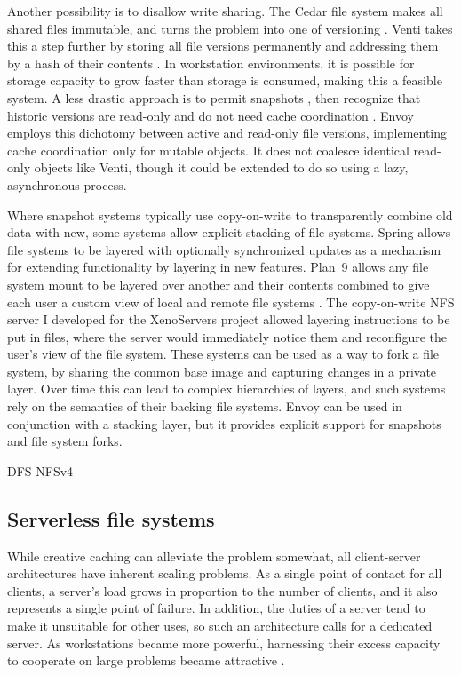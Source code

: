 Another possibility is to disallow write sharing. The Cedar file system \cite{schroeder} makes all shared files immutable, and turns the problem into one of versioning \cite{gifford}. Venti takes this a step further by storing all file versions permanently and addressing them by a hash of their contents \cite{quinlan}. In workstation environments, it is possible for storage capacity to grow faster than storage is consumed, making this a feasible system. A less drastic approach is to permit snapshots \cite{hitz}, then recognize that historic versions are read-only and do not need cache coordination \cite{warfield}. Envoy employs this dichotomy between active and read-only file versions, implementing cache coordination only for mutable objects. It does not coalesce identical read-only objects like Venti, though it could be extended to do so using a lazy, asynchronous process.

Where snapshot systems typically use copy-on-write to transparently combine old data with new, some systems allow explicit stacking of file systems. Spring \cite{khalidi} allows file systems to be layered with optionally synchronized updates as a mechanism for extending functionality by layering in new features. Plan~9 \cite{pike90} allows any file system mount to be layered over another and their contents combined to give each user a custom view of local and remote file systems \cite{pike92}. The copy-on-write NFS server I developed for the XenoServers project \cite{kotsovinos} allowed layering instructions to be put in files, where the server would immediately notice them and reconfigure the user's view of the file system. These systems can be used as a way to fork a file system, by sharing the common base image and capturing changes in a private layer. Over time this can lead to complex hierarchies of layers, and such systems rely on the semantics of their backing file systems. Envoy can be used in conjunction with a stacking layer, but it provides explicit support for snapshots and file system forks.

DFS \cite{kazar}
NFSv4

\subsection{Serverless file systems}

While creative caching can alleviate the problem somewhat, all client-server architectures have inherent scaling problems. As a single point of contact for all clients, a server's load grows in proportion to the number of clients, and it also represents a single point of failure. In addition, the duties of a server tend to make it unsuitable for other uses, so such an architecture calls for a dedicated server. As workstations became more powerful, harnessing their excess capacity to cooperate on large problems became attractive \cite{anderson95a}.


